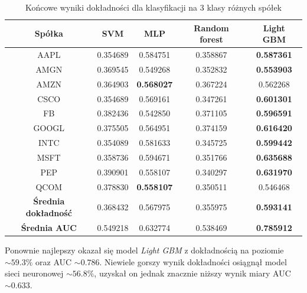 \documentclass[a4paper, twoside, 11pt, openright]{article}
\begin{document}
\begin{table}[H]
    \centering
    \begin{tabular}{|c|c|c|c|c|}
    \hline
        \textbf{Spółka} & \textbf{SVM} &  \textbf{MLP}  &  \textbf{Random forest}  &  \textbf{Light GBM} \\ \hline
AAPL   &  0.354689 & 0.584751  & 0.358867 & \textbf{0.587361} \\ \hline
AMGN   &  0.369545 &  0.549268 & 0.352832 &  \textbf{0.553903} \\ \hline
AMZN   &  0.364903 & \textbf{0.568027} & 0.367224  & 0.562268 \\ \hline
CSCO   &  0.354689 &  0.569161 & 0.347261 &  \textbf{0.601301} \\ \hline
FB     &  0.382436 & 0.542850 & 0.371105 & \textbf{0.596591} \\ \hline
GOOGL  &  0.375505 &  0.564951 & 0.374159 & \textbf{0.616420} \\ \hline
INTC   &  0.354089 & 0.581633  & 0.345725 & \textbf{0.599442} \\ \hline
MSFT   &  0.358736 &   0.594671 & 0.351766 &  \textbf{0.635688} \\ \hline
PEP    &  0.390901 & 0.558107  & 0.340297 & \textbf{0.631970} \\ \hline
QCOM   &  0.378830 &  \textbf{0.558107} & 0.350511 & 0.546468 \\ \hline \hline
\textbf{Średnia dokładność} &  0.368432 & 0.567975 & 0.355975 & \textbf{0.593141} \\  \hline  
\textbf{Średnia AUC} &  0.549218 & 0.632774 & 0.538469 & \textbf{0.785912} \\  \hline
    \end{tabular}
    \caption{Końcowe wyniki dokładności dla klasyfikacji na 3 klasy różnych spółek}
    \label{tab:comparison_final_discrete}
\end{table}

Ponownie najlepszy okazał się model \textit{Light GBM} z dokładnością na poziomie $\sim 59.3\%$ oraz AUC $\sim 0.786$. Niewiele gorszy wynik dokładności osiągnął model sieci neuronowej $\sim 56.8\%$,  uzyskał on jednak znacznie niższy wynik miary AUC $\sim 0.633$.
\end{document}
